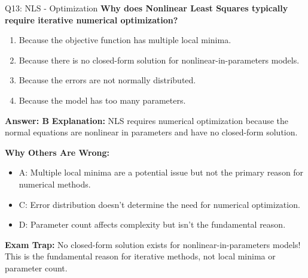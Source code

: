 \documentclass[8pt]{beamer}
\begin{document}
	\begin{frame}{Q13: NLS - Optimization}
		\fontsize{6.5}{7.5}\selectfont
		\textbf{Why does Nonlinear Least Squares typically require iterative numerical optimization?}
		
		\begin{enumerate}
			\item Because the objective function has multiple local minima.
			\item Because there is no closed-form solution for nonlinear-in-parameters models.
			\item Because the errors are not normally distributed.
			\item Because the model has too many parameters.
		\end{enumerate}
		
		\vspace{0.05cm}
		\textcolor{myblue}{\textbf{Answer: B}}
		\vspace{0.05cm}
		\textcolor{myblue}{\textbf{Explanation:}} NLS requires numerical optimization because the normal equations are nonlinear in parameters and have no closed-form solution.
		
		\vspace{0.05cm}
		\textcolor{myred}{\textbf{Why Others Are Wrong:}}
		\begin{itemize}
			\item \textcolor{myred}{A:} Multiple local minima are a potential issue but not the primary reason for numerical methods.
			\item \textcolor{myred}{C:} Error distribution doesn't determine the need for numerical optimization.
			\item \textcolor{myred}{D:} Parameter count affects complexity but isn't the fundamental reason.
		\end{itemize}
		
		\textcolor{myred}{\textbf{Exam Trap:}} No closed-form solution exists for \textcolor{myblue}{nonlinear-in-parameters} models! This is the fundamental reason for iterative methods, not local minima or parameter count.
	\end{frame}
	
\end{document}
